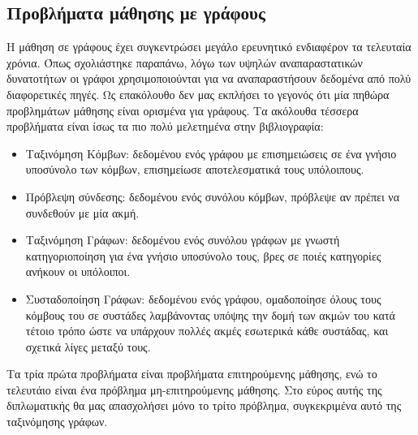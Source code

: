 \subsection{Προβλήματα μάθησης με γράφους}
Η μάθηση σε γράφους έχει συγκεντρώσει μεγάλο ερευνητικό ενδιαφέρον τα τελευταία χρόνια.
Όπως σχολιάστηκε παραπάνω, λόγω των υψηλών αναπαραστατικών δυνατοτήτων οι γράφοι χρησιμοποιούνται για να αναπαραστήσουν δεδομένα από πολύ διαφορετικές πηγές.
Ως επακόλουθο δεν μας εκπλήσει το γεγονός ότι μία πηθώρα προβλημάτων μάθησης είναι ορισμένα για γράφους. Τα ακόλουθα τέσσερα προβλήματα είναι ίσως τα πιο πολύ μελετημένα στην βιβλιογραφία:
\begin{itemize}
\item Ταξινόμηση Κόμβων: δεδομένου ενός γράφου με επισημειώσεις σε ένα γνήσιο υποσύνολο των κόμβων, επισημείωσε αποτελεσματικά τους υπόλοιπους.
\item Πρόβλεψη σύνδεσης: δεδομένου ενός συνόλου κόμβων, πρόβλεψε αν πρέπει να συνδεθούν με μία ακμή.
\item Ταξινόμηση Γράφων: δεδομένου ενός συνόλου γράφων με γνωστή κατηγοριοποίηση για ένα γνήσιο υποσύνολο τους, βρες σε ποιές κατηγορίες ανήκουν οι υπόλοιποι.
\item Συσταδοποίηση Γράφων: δεδομένου ενός γράφου, ομαδοποίησε όλους τους κόμβους του σε συστάδες λαμβάνοντας υπόψης την δομή των ακμών του κατά τέτοιο τρόπο ώστε να υπάρχουν πολλές ακμές εσωτερικά κάθε συστάδας, και σχετικά λίγες μεταξύ τους.
\end{itemize}
Τα τρία πρώτα προβλήματα είναι προβλήματα επιτηρούμενης μάθησης, ενώ το τελευτάιο είναι ένα πρόβλημα μη-επιτηρούμενης μάθησης.
Στο εύρος αυτής της διπλωματικής θα μας απασχολήσει μόνο το τρίτο πρόβλημα, συγκεκριμένα αυτό της ταξινόμησης γράφων.

